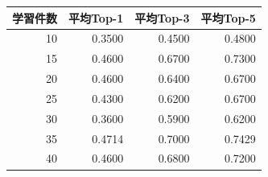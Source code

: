 \begin{tabular}{r r r r}
\hline
学習件数 & 平均Top-1 & 平均Top-3 & 平均Top-5 \\
\hline
10 & 0.3500 & 0.4500 & 0.4800 \\
15 & 0.4600 & 0.6700 & 0.7300 \\
20 & 0.4600 & 0.6400 & 0.6700 \\
25 & 0.4300 & 0.6200 & 0.6700 \\
30 & 0.3600 & 0.5900 & 0.6200 \\
35 & 0.4714 & 0.7000 & 0.7429 \\
40 & 0.4600 & 0.6800 & 0.7200 \\
\hline
\end{tabular}
